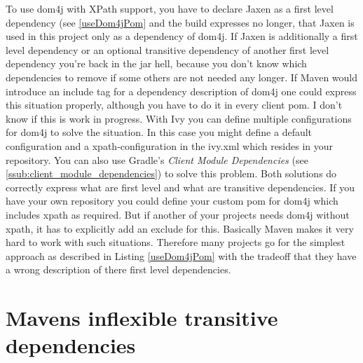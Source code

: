 To use dom4j with XPath support, you have to declare Jaxen as a first level dependency (see \ref{useDom4jPom} and the build expresses no longer, that Jaxen is used in this project only as a dependency of dom4j. If Jaxen is additionally a first level dependency or an optional transitive dependency of another first level dependency you’re back in the jar hell, because you don’t know which dependencies to remove if some others are not needed any longer. If Maven would introduce an include tag for a dependency description of dom4j one could express this situation properly, although you have to do it in every client pom. I don’t know if this is work in progress. With Ivy you can define multiple configurations for dom4j to solve the situation. In this case you might define a default configuration and a xpath-configuration in the ivy.xml which resides in your repository. You can also use Gradle's \emph{Client Module Dependencies} (see \ref{ssub:client_module_dependencies}) to solve this problem. Both solutions do correctly express what are first level and what are transitive dependencies. If you have your own repository you could define your custom pom for dom4j which includes xpath as required. But if another of your projects needs dom4j without xpath, it has to explicitly add an exclude for this. Basically Maven makes it very hard to work with such situations. Therefore many projects go for the simplest approach as described in Listing \ref{useDom4jPom} with the tradeoff that they have a wrong description of there first level dependencies.


\section{Mavens inflexible transitive dependencies} %
\label{sec:mavens_inflexible_transitive_dependencies}

